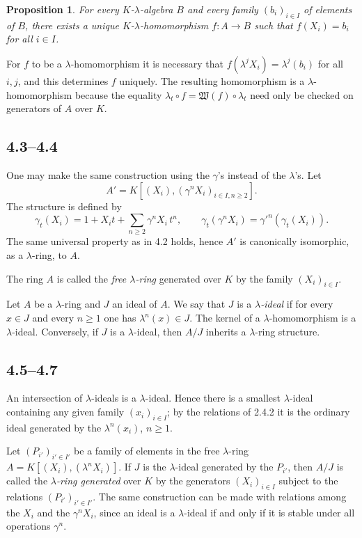 \documentclass[11pt]{article}
\theoremstyle{plain}
\newtheorem{proposition}[theorem]{Proposition}
\theoremstyle{definition}
\theoremstyle{remark}
\begin{document}
\begin{proposition}
For every $K$-$\lambda$-algebra $B$ and every family $(b_i)_{i\in I}$ of elements of $B$, there exists a unique $K$-$\lambda$-homomorphism $f:A\to B$ such that $f(X_i)=b_i$ for all $i\in I$.
\end{proposition}

For $f$ to be a $\lambda$-homomorphism it is necessary that $f(\lambda^jX_i)=\lambda^j(b_i)$ for all $i,j$, and this determines $f$ uniquely. The resulting homomorphism is a $\lambda$-homomorphism because the equality $\lambda_t\circ f=\mathfrak W(f)\circ\lambda_t$ need only be checked on generators of $A$ over $K$.

\subsection*{4.3--4.4}
One may make the same construction using the $\gamma$'s instead of the $\lambda$'s. Let
\[
A'=K[(X_i),(\gamma^nX_i)_{i\in I,n\geq 2}].
\]
The structure is defined by
\begin{equation}\label{eq:4.3.1}
\gamma_t(X_i)=1+X_it+\sum_{n\geq 2}\gamma^nX_i\,t^n,
\qquad
\gamma_t(\gamma^nX_i)=\gamma'^n(\gamma_t(X_i)).
\end{equation}
The same universal property as in 4.2 holds, hence $A'$ is canonically isomorphic, as a $\lambda$-ring, to $A$.

The ring $A$ is called the \emph{free $\lambda$-ring} generated over $K$ by the family $(X_i)_{i\in I}$.

Let $A$ be a $\lambda$-ring and $J$ an ideal of $A$. We say that $J$ is a \emph{$\lambda$-ideal} if for every $x\in J$ and every $n\geq 1$ one has $\lambda^n(x)\in J$. The kernel of a $\lambda$-homomorphism is a $\lambda$-ideal. Conversely, if $J$ is a $\lambda$-ideal, then $A/J$ inherits a $\lambda$-ring structure.

\subsection*{4.5--4.7}
An intersection of $\lambda$-ideals is a $\lambda$-ideal. Hence there is a smallest $\lambda$-ideal containing any given family $(x_i)_{i\in I}$; by the relations of 2.4.2 it is the ordinary ideal generated by the $\lambda^n(x_i)$, $n\geq 1$.

Let $(P_{i'})_{i'\in I'}$ be a family of elements in the free $\lambda$-ring $A=K[(X_i),(\lambda^nX_i)]$. If $J$ is the $\lambda$-ideal generated by the $P_{i'}$, then $A/J$ is called the \emph{$\lambda$-ring generated} over $K$ by the generators $(X_i)_{i\in I}$ subject to the relations $(P_{i'})_{i'\in I'}$. The same construction can be made with relations among the $X_i$ and the $\gamma^nX_i$, since an ideal is a $\lambda$-ideal if and only if it is stable under all operations $\gamma^n$.
\end{document}
